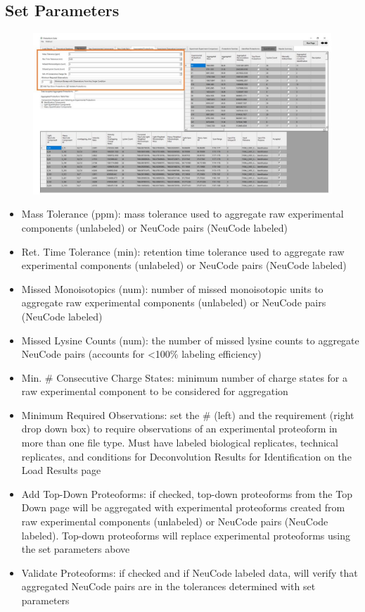 \subsection{Set Parameters}
\begin{figure}[h]
\centering
\includegraphics[scale=0.5]{figures/aggregated_proteoforms1.jpg}
\end{figure}
\begin{itemize}
\item Mass Tolerance (ppm): mass tolerance used to aggregate raw experimental components (unlabeled) or NeuCode pairs (NeuCode labeled)
\item Ret. Time Tolerance (min): retention time tolerance used to aggregate raw experimental components (unlabeled) or NeuCode pairs (NeuCode labeled)
\item Missed Monoisotopics (num): number of missed monoisotopic units to aggregate raw experimental components (unlabeled) or NeuCode pairs (NeuCode labeled)
\item Missed Lysine Counts (num): the number of missed lysine counts to aggregate NeuCode pairs (accounts for <100\% labeling efficiency)
\item Min. \# Consecutive Charge States:  minimum number of charge states for a raw experimental component to be considered for aggregation
\item Minimum Required Observations: set the \# (left) and the requirement (right drop down box) to require observations of an experimental proteoform in more than one file type. Must have labeled biological replicates, technical replicates, and conditions for Deconvolution Results for Identification on the Load Results page
\item Add Top-Down Proteoforms: if checked, top-down proteoforms from the Top Down page will be aggregated with experimental proteoforms created from raw experimental components (unlabeled) or NeuCode pairs (NeuCode labeled). Top-down proteoforms will replace experimental proteoforms using the set parameters above
\item Validate Proteoforms: if checked and if NeuCode labeled data, will verify that aggregated NeuCode pairs are in the tolerances determined with set parameters
\end{itemize}

